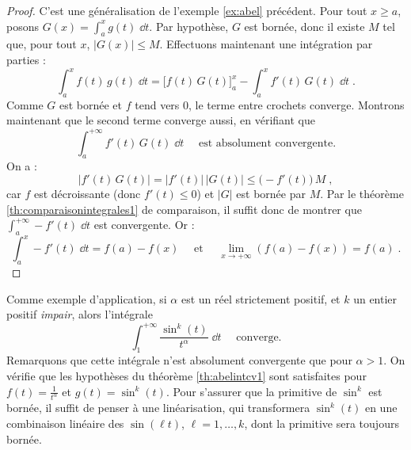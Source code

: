 \documentclass[class=report,crop=false]{standalone}
\begin{document}
\begin{proof} 
C'est une généralisation de l'exemple \ref{ex:abel} précédent.
Pour tout $x\ge a$, posons $G(x) = \int_a^x g(t)\;\dd t$. Par
hypothèse, $G$ est bornée, donc il existe $M$ tel que, pour tout $x$,  
$|G(x)|\le M$. Effectuons maintenant une intégration par parties :
$$\int_a^x f(t)\,g(t)\;\dd t = \Big[ f(t)\,G(t)\Big ]_a^x 
-\int_a^x f'(t)\,G(t)\;\dd t\;.$$
Comme $G$ est bornée et $f$ tend vers $0$, le terme 
entre crochets converge. Montrons maintenant que le second terme
converge aussi, en vérifiant que 
$$\int_a^{+\infty} f'(t)\,G(t)\;\dd t\quad
\text{ est absolument convergente.} $$
On a :
$$\big|f'(t)\,G(t)\big| =\big|f'(t)\big|\,\big|G(t)\big| \le \big(-f'(t)\big)\,M\;,$$ 
car $f$ est décroissante (donc $f'(t)\le 0$) et $|G|$ est bornée
par $M$. Par le théorème \ref{th:comparaisonintegrales1} de comparaison, 
il suffit donc de montrer que
$\int_a^{+\infty} -f'(t) \;\dd t$ est convergente. Or :
$$
\int_a^x -f'(t)\;\dd t = f(a)-f(x)\quad \text{ et } \quad
\lim_{x\rightarrow+\infty}(f(a)-f(x)) = f(a)\;. 
$$ 
\end{proof} 

\begin{exemple}
Comme exemple d'application, si $\alpha$ est un réel strictement
positif, et $k$ un entier positif \emph{impair}, alors l'intégrale 
$$
\int_1^{+\infty} \frac{\sin^k(t)}{t^\alpha}\;\dd t\quad\text{ converge.}
$$
Remarquons que cette intégrale n'est absolument convergente que 
pour $\alpha>1$.
On vérifie que les hypothèses du théorème \ref{th:abelintcv1} sont
satisfaites pour $f(t) = \frac{1}{t^\alpha}$ et $g(t)=\sin^k(t)$. Pour
s'assurer que la primitive de $\sin^k$ est bornée, il suffit de
penser à une linéarisation, qui transformera $\sin^k(t)$ en une
combinaison linéaire des $\sin(\ell t)$, $\ell=1,\ldots, k$, dont la
primitive sera toujours bornée.  
\end{exemple}


\end{document}
